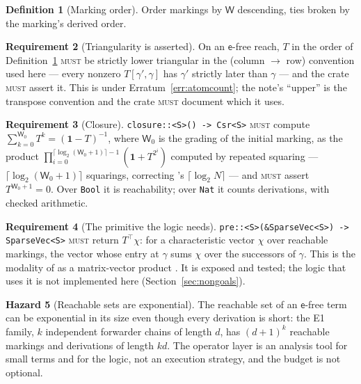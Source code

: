 \documentclass[11pt,a4paper]{article}
\newcommand{\code}[1]{\texttt{#1}}
\newcommand{\MUST}{\textsc{must}}
\newcommand{\ev}{\mathsf{e}}
\newcommand{\Wt}{\mathsf{W}}
\theoremstyle{definition}
\newtheorem{definition}{Definition}[section]
\newtheorem{requirement}[definition]{Requirement}
\newtheorem{hazard}[definition]{Hazard}
\theoremstyle{plain}
\begin{document}
\begin{definition}[Marking order]\label{def:morder}
Order markings by $\Wt$ descending, ties broken by the marking's derived
order.
\end{definition}

\begin{requirement}[Triangularity is asserted]\label{req:tri}
On an $\ev$-free reach, $T$ in the order of Definition~\ref{def:morder}
\MUST{} be strictly lower triangular in the (column $\to$ row) convention
used here --- every nonzero $T[\gamma',\gamma]$ has $\gamma'$ strictly later
than $\gamma$ --- and the crate \MUST{} assert it. This is
\cite[Thm.~6.1(ii)]{matnote} under Erratum~\ref{err:atomcount}; the note's
``upper'' is the transpose convention and the crate \MUST{} document which it
uses.
\end{requirement}

\begin{requirement}[Closure]\label{req:closure}
\code{closure::<S>() -> Csr<S>} \MUST{} compute
$\sum_{k=0}^{\Wt_{0}} T^{k} = (\mathbf{1}-T)^{-1}$, where $\Wt_{0}$ is the
grading of the initial marking, as the product
$\prod_{i=0}^{\lceil \log_2(\Wt_{0}+1) \rceil - 1} (\mathbf{1} + T^{2^{i}})$
computed by repeated squaring --- $\lceil \log_{2}(\Wt_{0}+1)\rceil$ squarings,
correcting \cite[Cor.~6.2]{matnote}'s $\lceil\log_{2} N\rceil$ --- and
\MUST{} assert $T^{\Wt_{0}+1} = 0$. Over \code{Bool} it is reachability;
over \code{Nat} it counts derivations, with checked arithmetic.
\end{requirement}

\begin{requirement}[The primitive the logic needs]\label{req:pre}
\code{pre::<S>(\&SparseVec<S>) -> SparseVec<S>} \MUST{} return
$T^{\top}\chi$: for a characteristic vector $\chi$ over reachable markings, the
vector whose entry at $\gamma$ sums $\chi$ over the successors of $\gamma$.
This is the modality of \cite{logic} as a matrix-vector product
\cite[Rem.~11.1]{matnote}. It is exposed and tested; the logic that uses it is
not implemented here (Section~\ref{sec:nongoals}).
\end{requirement}

\begin{hazard}[Reachable sets are exponential]\label{haz:reachexp}
The reachable set of an $\ev$-free term can be exponential in its size even
though every derivation is short: the E1 family, $k$ independent forwarder
chains of length $d$, has $(d+1)^{k}$ reachable markings and derivations of
length $kd$. The operator layer is an analysis
tool for small terms and for the logic, not an execution strategy, and the
budget is not optional.
\end{hazard}
\end{document}
